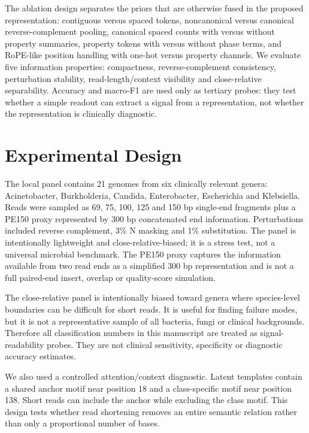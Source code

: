 \documentclass[11pt]{article}
\begin{document}
The ablation design separates the priors that are otherwise fused in the proposed representation: contiguous versus spaced tokens, noncanonical versus canonical reverse-complement pooling, canonical spaced counts with versus without property summaries, property tokens with versus without phase terms, and RoPE-like position handling with one-hot versus property channels. We evaluate five information properties: compactness, reverse-complement consistency, perturbation stability, read-length/context visibility and close-relative separability. Accuracy and macro-F1 are used only as tertiary probes: they test whether a simple readout can extract a signal from a representation, not whether the representation is clinically diagnostic.


\section*{Experimental Design}

The local panel contains 21 genomes from six clinically relevant genera: Acinetobacter, Burkholderia, Candida, Enterobacter, Escherichia and Klebsiella. Reads were sampled as 69, 75, 100, 125 and 150 bp single-end fragments plus a PE150 proxy represented by 300 bp concatenated end information. Perturbations included reverse complement, 3\% N masking and 1\% substitution. The panel is intentionally lightweight and close-relative-biased; it is a stress test, not a universal microbial benchmark. The PE150 proxy captures the information available from two read ends as a simplified 300 bp representation and is not a full paired-end insert, overlap or quality-score simulation.


The close-relative panel is intentionally biased toward genera where species-level boundaries can be difficult for short reads. It is useful for finding failure modes, but it is not a representative sample of all bacteria, fungi or clinical backgrounds. Therefore all classification numbers in this manuscript are treated as signal-readability probes. They are not clinical sensitivity, specificity or diagnostic accuracy estimates.


We also used a controlled attention/context diagnostic. Latent templates contain a shared anchor motif near position 18 and a class-specific motif near position 138. Short reads can include the anchor while excluding the class motif. This design tests whether read shortening removes an entire semantic relation rather than only a proportional number of bases.
\end{document}

